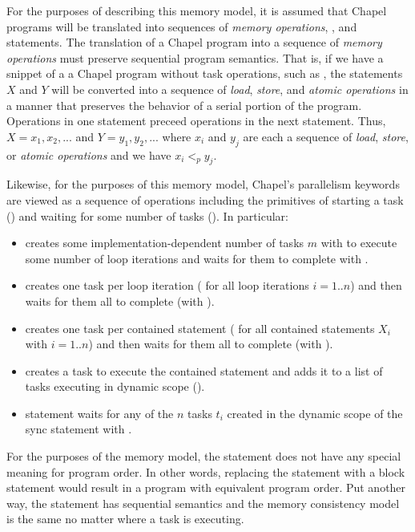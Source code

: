For the purposes of describing this memory model, it is assumed that Chapel
programs will be translated into sequences of \textit{memory operations},
, and  statements. The translation of a Chapel program
into a sequence of \textit{memory operations} must preserve sequential program
semantics. That is, if we have a snippet of a a Chapel program without task
operations, such as , the statements $X$ and $Y$ will be converted
into a sequence of \textit{load}, \textit{store}, and \textit{atomic
operations} in a manner that preserves the behavior of a serial portion of the
program. Operations in one statement preceed operations in the next statement.
Thus, $X=x_1,x_2,...$ and $Y=y_1,y_2,...$ where $x_i$ and $y_j$ are each a
sequence of \textit{load}, \textit{store}, or \textit{atomic operations} and we
have $x_i <_p y_j$.

Likewise, for the purposes of this memory model, Chapel's parallelism keywords
are viewed as a sequence of operations including the primitives of starting a
task () and waiting for some number of tasks
(). In particular:

\begin{itemize}
  \item {} creates some implementation-dependent number of tasks $m$ with  to execute some number of loop iterations and waits for them to complete with .
  \item {} creates one task per loop iteration ( for all loop iterations $i=1..n$) and then waits for them all to complete (with ).
  \item {} creates one task per contained statement ( for all contained statements $X_i$ with $i=1..n$) and then waits for them all to complete (with ).
  \item {} creates a task to execute the contained statement and adds it to a list of tasks executing in dynamic scope ().
  \item {} statement waits for any of the $n$ tasks $t_i$ created in the dynamic scope of the sync statement with .
\end{itemize}

For the purposes of the memory model, the  statement does not have any
special meaning for program order. In other words, replacing the 
statement with a block statement would result in a program with equivalent
program order. Put another way, the  statement has sequential semantics and the memory consistency model is the same no matter where a task is executing.

